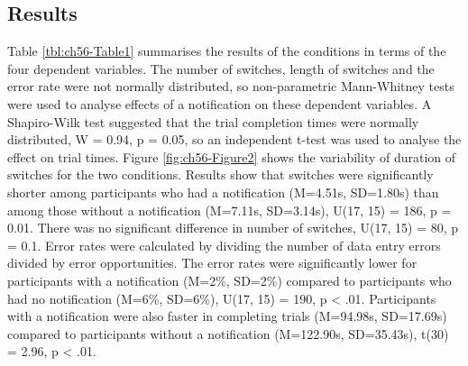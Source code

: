 \subsection{Results}
Table \ref{tbl:ch56-Table1} summarises the results of the conditions in terms of the four dependent variables. The number of switches, length of switches and the error rate were not normally distributed, so non-parametric Mann-Whitney tests were used to analyse effects of a notification on these dependent variables. A Shapiro-Wilk test suggested that the trial completion times were normally distributed, W = 0.94, p = 0.05, so an independent t-test was used to analyse the effect on trial times. 
Figure \ref{fig:ch56-Figure2} shows the variability of duration of switches for the two conditions. Results show that switches were significantly shorter among participants who had a notification (M=4.51s, SD=1.80s) than among those without a notification (M=7.11s, SD=3.14s), U(17, 15) = 186, p = 0.01. There was no significant difference in number of switches, U(17, 15) = 80, p = 0.1.
Error rates were calculated by dividing the number of data entry errors divided by error opportunities. The error rates were significantly lower for participants with a notification (M=2\%, SD=2\%) compared to participants who had no notification (M=6\%, SD=6\%), U(17, 15) = 190, p < .01. Participants with a notification were also faster in completing trials (M=94.98s, SD=17.69s) compared to participants without a notification (M=122.90s, SD=35.43s), t(30) = 2.96, p < .01.

